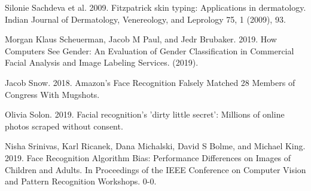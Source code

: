 \documentclass[11pt, a4paper]{article}
\begin{document}
\begin{thebibliography}{9}
    Silonie Sachdeva et al. 2009. Fitzpatrick skin typing: Applications in dermatology.
    Indian Journal of Dermatology, Venereology, and Leprology 75, 1 (2009), 93.
    
    Morgan Klaus Scheuerman, Jacob M Paul, and Jedr Brubaker. 2019. How Computers See Gender:
    An Evaluation of Gender Classification in Commercial Facial Analysis and Image Labeling Services. (2019).

    Jacob Snow. 2018. Amazon's Face Recognition Falsely Matched 28
    Members of Congress With Mugshots. 
    
    Olivia Solon. 2019. Facial recognition’s ’dirty little secret’: Millions of online photos scraped without consent.
    
    Nisha Srinivas, Karl Ricanek, Dana Michalski, David S Bolme, and Michael King.
    2019. Face Recognition Algorithm Bias: Performance Differences on Images of
    Children and Adults. In Proceedings of the IEEE Conference on Computer Vision and Pattern Recognition Workshops. 0-0.
\end{thebibliography}
\end{document}
